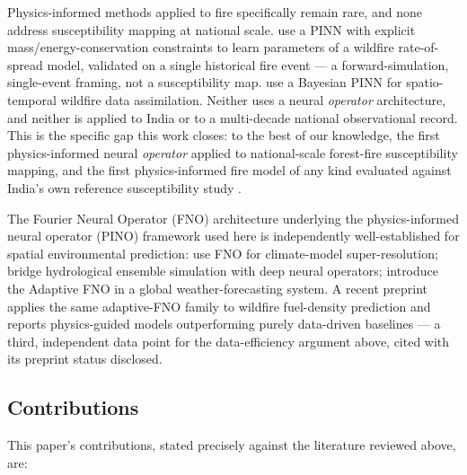 \documentclass[journal]{IEEEtran}
\begin{document}
Physics-informed methods applied to fire specifically remain rare, and none address susceptibility mapping at national scale. \cite{vogiatzoglou2025} use a PINN with explicit mass/energy-conservation constraints to learn parameters of a wildfire rate-of-spread model, validated on a single historical fire event --- a forward-simulation, single-event framing, not a susceptibility map. \cite{dabrowski2023} use a Bayesian PINN for spatio-temporal wildfire data assimilation. Neither uses a neural \emph{operator} architecture, and neither is applied to India or to a multi-decade national observational record. This is the specific gap this work closes: to the best of our knowledge, the first physics-informed neural \emph{operator} applied to national-scale forest-fire susceptibility mapping, and the first physics-informed fire model of any kind evaluated against India's own reference susceptibility study \cite{biswas2025}.

The Fourier Neural Operator (FNO) architecture underlying the physics-informed neural operator (PINO) framework used here \cite{li2021fno,li2023pino,kovachki2021} is independently well-established for spatial environmental prediction: \cite{jiang2023} use FNO for climate-model super-resolution; \cite{sun2024} bridge hydrological ensemble simulation with deep neural operators; \cite{kurth2023} introduce the Adaptive FNO in a global weather-forecasting system. A recent preprint \cite{caglar2026} applies the same adaptive-FNO family to wildfire fuel-density prediction and reports physics-guided models outperforming purely data-driven baselines --- a third, independent data point for the data-efficiency argument above, cited with its preprint status disclosed.

\subsection{Contributions}

This paper's contributions, stated precisely against the literature reviewed above, are:
\end{document}
